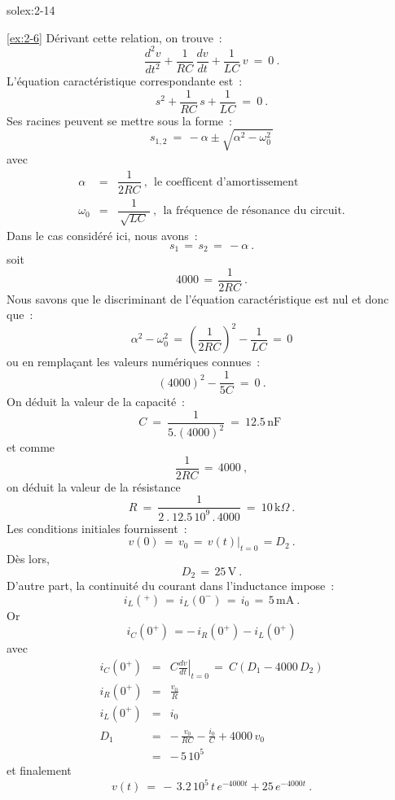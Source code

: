 \begin{exwithsol}{solex:2-14}
\begin{solexercise}{\ref{ex:2-6}}
D\'erivant cette relation, on trouve~:
\[ \dfrac{d^2v}{dt^2} + \dfrac{1}{RC} \, \dfrac{dv}{dt} + \dfrac{1}{LC} \, v \: = \: 0~. \]
L'\'equation caract\'eristique correspondante est~:
\[ s^2 + \dfrac{1}{RC} \, s + \dfrac{1}{LC} \: = \: 0~. \]
Ses racines peuvent se mettre sous la forme~:
\[ s_{1,2} \: = \, -\alpha \pm \sqrt{\alpha^2 - \omega_0^2\,} \]
avec
\begin{eqnarray*}
	\alpha &=& \dfrac{1}{2RC}~, ~~\mbox{le coefficent d'amortissement}\\
	\omega_0 &=& \dfrac{1}{\, \sqrt{LC}\,}~, ~~\mbox{la fr\'equence de r\'esonance du circuit.}
\end{eqnarray*}
Dans le cas consid\'er\'e ici, nous avons~:
\[ s_1 \, =\,  s_2\, =\,  -\alpha~. \]
soit
\[ 4000 \, =\,  \dfrac{1}{2RC}~. \]
Nous savons que le discriminant de l'\'equation caract\'eristique est nul et donc que~:
\[ \alpha^2 - \omega_0^2 \, = \, \left( \dfrac{1}{2RC}\right)^2 - \dfrac{1}{LC} \, = \, 0 \]
ou en rempla\c{c}ant les valeurs num\'eriques connues~:
\[  (4000)^2 - \dfrac{1}{5C} \: = \: 0~. \]
On d\'eduit la valeur de la capacit\'e~:
\[ C \: = \: \dfrac{1}{5.(4000)^2} \: = \: 12.5\, \mbox{nF~} \]
et comme
\[ \dfrac{1}{2RC} \, = \, 4000~,\]
on d\'eduit la valeur de la r\'esistance
\[ R \: = \: \dfrac{1}{2\: . \: 12.5\, 10^9\, . \, 4000} \: = \: 10\,\mbox{k}\Omega~. \]
Les conditions initiales fournissent~:
\[ v(0) \, = \, v_0 \, = \, \left. v(t)\right|_{t=0} \,=  D_2~. \]
D\`es lors,
\[ D_2 \, = \, 25\, \mbox{V}~. \]
D'autre part, la continuit\'e du courant dans l'inductance impose~:
\[ i_L(^+) \, = \, i_L(0^-) \, = \, i_0 \, = \, 5\, \mbox{mA}~.\]
Or
\[ i_C(0^+) \, = -\, i_R(0^+) - i_L(0^+) \]
avec
\begin{eqnarray*}
	i_C(0^+) &=& C \left. \frac{dv}{dt}\right|_{t=0} \, = \: C\left( D_1 - 4000\, D_2 \right)\\
	i_R(0^+) &=& \frac{v_0}{R}\\
	i_L(0^+) &=& i_0\\
	D_1 &=& -\, \frac{v_0}{RC} - \frac{i_0}{C} + 4000\, v_0\\
	&=& -\, 5\, 10^5
\end{eqnarray*}
et finalement
\[ v(t) \: = \, -\, 3.2\, 10^5\, t \, e^{-4000t} + 25\, e^{-4000t}~. \]
\end{solexercise}


\end{exwithsol}
